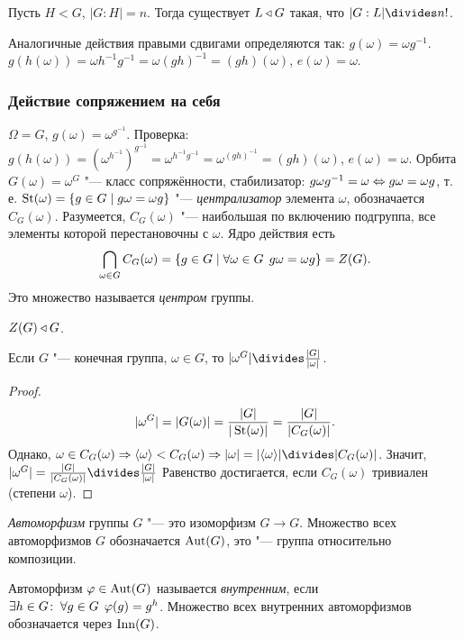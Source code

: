 \documentclass[main]{subfiles}
\begin{document}
\begin{exercise}
  Пусть $H < G$, $|G:H| = n$.
  Тогда существует $L \triangleleft G$ такая,
  что $|G:L| \divides n!$.
\end{exercise}

Аналогичные действия правыми сдвигами определяются так:
$g(\omega) = \omega g^{-1}$.
$g(h(\omega)) = \omega h^{-1} g^{-1} = \omega (gh)^{-1} = (gh)(\omega)$,
$e(\omega) = \omega$.

\subsubsection{Действие сопряжением на себя}
$\Omega = G$, $g(\omega) = \omega^{g^{-1}}$.
Проверка: $g(h(\omega)) = (\omega^{h^{-1}})^{g^{-1}} =
\omega^{h^{-1}g^{-1}} = \omega^{(gh)^{-1}} = (gh)(\omega)$,
$e(\omega) = \omega$.
Орбита $G(\omega) = \omega^G$ "--- класс сопряжённости,
стабилизатор: $g\omega g^{-1} = \omega \Leftrightarrow g \omega = \omega g$,
т. е. $\operatorname{St}(\omega) = \{ g \in G \mid g\omega = \omega g \}$ "---
\emph{централизатор} элемента $\omega$,
обозначается $C_G(\omega)$.
Разумеется, $C_G(\omega)$ "--- наибольшая по включению подгруппа,
все элементы которой перестановочны с $\omega$.
Ядро действия есть
$$\bigcap_{\omega \in G} C_G(\omega) =
\{ g \in G \mid \forall {\omega \in G} \; \, g \omega = \omega g \} = Z(G).$$
Это множество называется \emph{центром} группы.

\begin{remark}
  $Z(G) \triangleleft G$.
\end{remark}

\begin{proposition}
  Если $G$ "--- конечная группа, $\omega \in G$,
  то $|\omega^G| \divides \frac{|G|}{|\omega|}$.
\end{proposition}
\begin{proof}
  $$|\omega^G| = |G(\omega)| = \frac{|G|}{|\operatorname{St}(\omega)|} =
  \frac{|G|}{|C_G(\omega)|}.$$
  Однако, $\omega \in C_G(\omega) \To
  \langle \omega \rangle < C_G(\omega) \To
  |\omega| = |\langle \omega \rangle | \divides |C_G(\omega)|$.
  Значит, $|\omega^G| = \frac{|G|}{|C_G(\omega)|}
  \divides \frac{|G|}{|\omega|}$
  Равенство достигается,
  если $C_G(\omega)$ тривиален (степени $\omega$).
\end{proof}

\begin{definition}
  \emph{Автоморфизм} группы $G$ "---
  это изоморфизм $G \to G$.
  Множество всех автоморфизмов $G$
  обозначается $\operatorname{Aut}(G)$, это "---
  группа относительно композиции.

  Автоморфизм $\varphi \in \operatorname{Aut}(G)$ называется \emph{внутренним},
  если $\exists h \in G \colon \: \forall {g \in G} \; \, \varphi(g) = g^h$.
  Множество всех внутренних автоморфизмов
  обозначается через $\operatorname{Inn}(G)$.
\end{definition}
\end{document}
